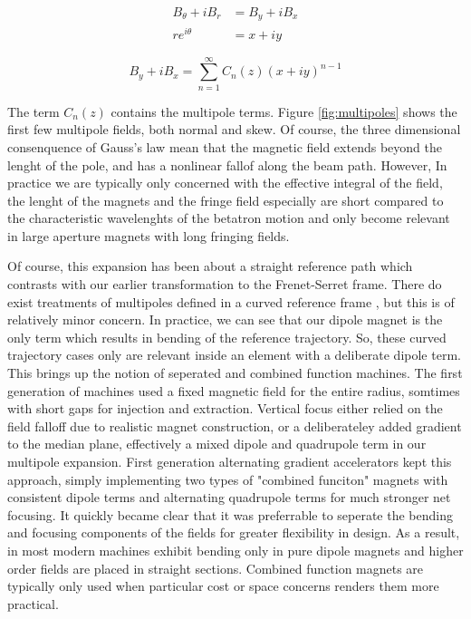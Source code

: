 \begin{equation} \label{eq:cylToCart}
\begin{split}
	B_{\theta} + i B_r &= B_y + i B_x\\
	r e^{i\theta} &= x + iy
\end{split}
\end{equation}

\begin{equation} \label{eq:bethCart}
	B_y + iB_x = \sum_{n=1}^{\infty} C_n(z) (x + iy)^{n-1}
\end{equation}

The term $C_n(z)$ contains the multipole terms. Figure \ref{fig:multipoles} shows the first few multipole fields, both normal and skew. Of course, the three dimensional consenquence of Gauss's law mean that the magnetic field extends beyond the lenght of the pole, and has a nonlinear fallof along the beam path. However, In practice we are typically only concerned with the effective integral of the field, the lenght of the magnets and the fringe field especially are short compared to the characteristic wavelenghts of the betatron motion and only become relevant in large aperture magnets with long fringing fields.

Of course, this expansion has been about a straight reference path which contrasts with our earlier transformation to the Frenet-Serret frame. There do exist treatments of multipoles defined in a curved reference frame \cite{ZolkinMultipole}, but this is of relatively minor concern. In practice, we can see that our dipole magnet is the only term which results in bending of the reference trajectory. So, these curved trajectory cases only are relevant inside an element with a deliberate dipole term. This brings up the notion of seperated and combined function machines. The first generation of machines used a fixed magnetic field for the entire radius, somtimes with short gaps for injection and extraction. Vertical focus either relied on the field falloff due to realistic magnet construction, or a deliberateley added gradient to the median plane, effectively a mixed dipole and quadrupole term in our multipole expansion. First generation alternating gradient accelerators kept this approach, simply implementing two types of "combined funciton" magnets with consistent dipole terms and alternating quadrupole terms for much stronger net focusing. It quickly became clear that it was preferrable to seperate the bending and focusing components of the fields for greater flexibility in design. As a result, in most modern machines exhibit bending only in pure dipole magnets and higher order fields are placed in straight sections. Combined function magnets are typically only used when particular cost or space concerns renders them more practical.

